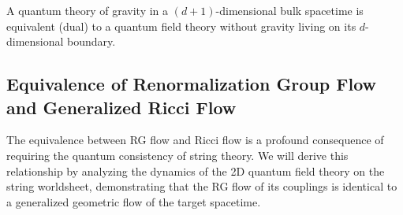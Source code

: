\documentclass[11pt, letterpaper]{report}
\theoremstyle{plain} %
\theoremstyle{definition} %
\theoremstyle{remark} %
\begin{document}
\begin{conjecture}
\label{conj:holography_final}
A quantum theory of gravity in a $(d+1)$-dimensional bulk spacetime is equivalent (dual) to a quantum field theory without gravity living on its $d$-dimensional boundary.
\end{conjecture}

\subsection{Equivalence of Renormalization Group Flow and Generalized Ricci Flow}
\label{subsec:rg_ricci}
The equivalence between RG flow and Ricci flow is a profound consequence of requiring the quantum consistency of string theory. We will derive this relationship by analyzing the dynamics of the 2D quantum field theory on the string worldsheet, demonstrating that the RG flow of its couplings is identical to a generalized geometric flow of the target spacetime.
\end{document}
